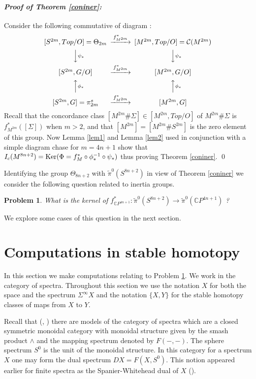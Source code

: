 \documentclass[a4paper,leqno,12pt]{amsart}
\theoremstyle{plain}
\newtheorem{prob}[theorem]{Problem}
\theoremstyle{definition}
\numberwithin{equation}{section}
\begin{document}
\paragraph{\it Proof of Theorem \ref{coniner}:}
Consider the following commutative of diagram :
$$
\begin{CD}
[S^{2m},Top/O]=\Theta_{2m}@>f^*_{M^{2m}}>> [M^{2m},Top/O]=\mathcal{C}(M^{2m})\\
@VV\psi_{*}V                      @VV\psi_{*}V\\
[S^{2m},G/O]  @>f^*_{M^{2m}}>> [M^{2m},G/O]\\
@AA\phi_{*}A                      @AA\phi_{*}A\\
[S^{2m},G]=\pi_{2m}^{s} @>f^*_{M^{2m}}>>  [M^{2m},G]
\end{CD}
$$
Recall that the concordance class $[M^{2m}\#\Sigma]\in [M^{2m},Top/O]$ of $M^{2m}\#\Sigma$ is $f^{*}_{M^{2m}}([\Sigma])$ when $m > 2$, and that $[M^{2m}]=[M^{2m}\#S^{2m}]$ is the zero element of this group. Now Lemma \ref{lem1} and Lemma \ref{lem2}  used in conjunction with a simple diagram chase for $m=4n+1$ show that $I_c(M^{8n+2})={\rm Ker}(\Phi=f_{M}^*\circ \phi_{*}^{-1}\circ \psi_{*})$ thus proving Theorem \ref{coniner}. \qed

Identifying the group $\Theta_{8n+2}$ with $\tilde{\pi}^0(S^{8n+2})$ in view of Theorem \ref{coniner} we consider the following question related to inertia groups.
\begin{prob}\label{main}
What is the kernel of $f_{{\mathbb{C}} P^{4n+1}}^\ast : \tilde{\pi}^0(S^{8n+2}) \to \tilde{\pi}^0({\mathbb{C}} P^{4n+1})$ ?
\end{prob}
We explore some cases of this question in the next section.

\section{Computations in stable homotopy}
In this section we make computations relating to Problem \ref{main}. We work in the category of spectra. Throughout this section we use the notation $X$ for both the space and the spectrum $\Sigma^\infty X$ and the notation $\{X,Y\}$ for the stable homotopy classes of maps from $X$ to $Y$. 

Recall that (\cite{EKMM}, \cite{sym}) there are  models of the category of spectra which are a closed symmetric monoidal category with monoidal structure given by the smash product $\wedge$ and the mapping spectrum denoted by $F(-,-)$. The sphere spectrum $S^0$ is the unit of the monoidal structure. In this category for a spectrum $X$ one may form the dual spectrum $DX = F(X,S^0)$. This notion appeared earlier for finite spectra as the Spanier-Whitehead dual of $X$ (\cite{Ada1}). 
\end{document}
